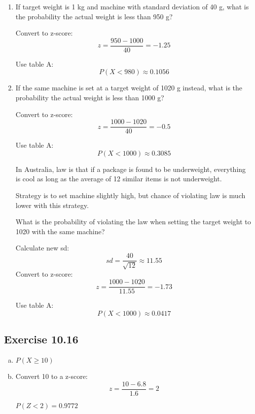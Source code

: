 \documentclass[letterpaper, landscape]{exam}
\begin{document}
  \begin{enumerate}
    \item If target weight is 1 kg and machine with standard deviation of 40 g,
      what is the probability the actual weight is less than 950 g?

    \begin{solution}
      Convert to z-score:
      \[
        z = \frac{950 - 1000}{40} = -1.25
      \]

      Use table A:\@
      \[
        P(X < 980) \approx 0.1056
      \]
    \end{solution}

    \item If the same machine is set at a target weight of 1020 g instead, what
      is the probability the actual weight is less than 1000 g?

    \begin{solution}
      Convert to z-score:
      \[
        z = \frac{1000 - 1020}{40} = -0.5
      \]

      Use table A:\@
      \[
        P(X < 1000) \approx 0.3085
      \]
    \end{solution}

    In Australia, law is that if a package is found to be underweight,
    everything is cool as long as the average of 12 similar items is not
    underweight.


    Strategy is to set machine slightly high, but chance of violating law is
    much lower with this strategy.

    What is the probability of violating the law when setting the target weight
    to 1020 with the same machine?

    \begin{solution}
      Calculate new sd:
      \[
        sd = \frac{40}{\sqrt{12}} \approx 11.55
      \]
      Convert to z-score:
      \[
        z = \frac{1000 - 1020}{11.55} = -1.73
      \]

      Use table A:\@
      \[
        P(X < 1000) \approx 0.0417
      \]
    \end{solution}

  \end{enumerate}

  \subsection{Exercise 10.16}
  \begin{enumerate}[(a)]
      \item $P(X \geq 10)$

      \item 
        Convert 10 to a z-score:
        \[
          z = \frac{10 - 6.8}{1.6} = 2
        \]

        $P(Z < 2) = 0.9772$

  \end{enumerate}
\end{document}
